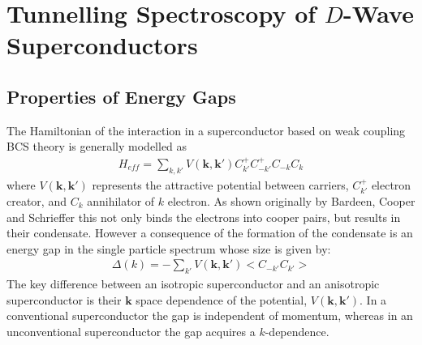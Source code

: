\newcommand{\DF}[2]{{\displaystyle\frac{#1}{#2}}}
\chapter{Tunnelling Spectroscopy of $D$-Wave Superconductors} %
\label{Chapter1}


\section{Properties of Energy Gaps}
The Hamiltonian of the interaction in a superconductor based on weak coupling BCS theory is generally modelled as 
\begin{eqnarray}
H_{eff}=\sum_{k,k'}V(\mathbf{k},\mathbf{k'})C_{k'}^+C_{-k'}^+C_{-k}C_k
\end{eqnarray}
where $V(\mathbf{k},\mathbf{k'})$ represents the attractive potential between carriers, $C_{k'}^+$ electron creator, and $C_{k}$ annihilator of $k$ electron.
As shown originally by Bardeen, Cooper and Schrieffer this not only binds the electrons into cooper pairs, but results in their condensate. However a consequence of the formation of the condensate is an energy gap in the single particle spectrum whose size is given by:
\begin{eqnarray}
\Delta(k) = -\sum_{k'}V(\mathbf{k},\mathbf{k'})<C_{-k'}C_{k'}>
\end{eqnarray}
The key difference between an isotropic superconductor and an anisotropic superconductor is their $\mathbf{k}$ space dependence of the potential, $V(\mathbf{k},\mathbf{k'})$.
In a conventional superconductor the gap is independent of momentum, whereas in an unconventional superconductor the gap acquires a $k$-dependence.
